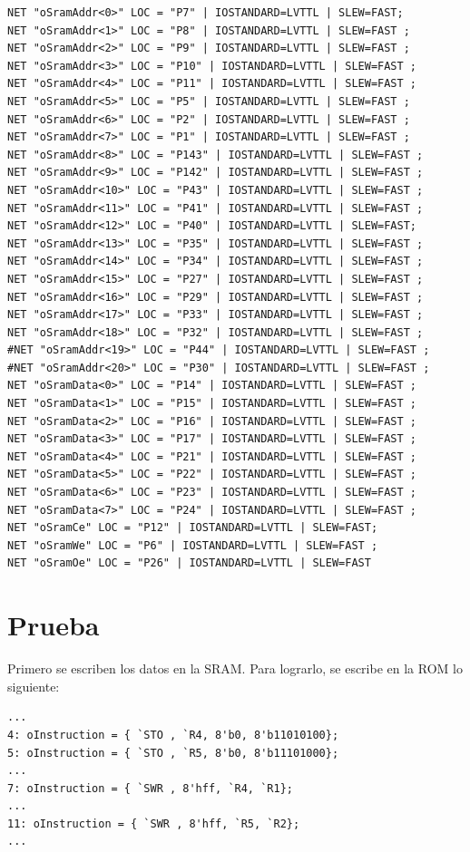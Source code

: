 \documentclass[10pt]{article}
\begin{document}
\begin{lstlisting}
NET "oSramAddr<0>" LOC = "P7" | IOSTANDARD=LVTTL | SLEW=FAST;
NET "oSramAddr<1>" LOC = "P8" | IOSTANDARD=LVTTL | SLEW=FAST ;
NET "oSramAddr<2>" LOC = "P9" | IOSTANDARD=LVTTL | SLEW=FAST ;
NET "oSramAddr<3>" LOC = "P10" | IOSTANDARD=LVTTL | SLEW=FAST ;
NET "oSramAddr<4>" LOC = "P11" | IOSTANDARD=LVTTL | SLEW=FAST ;
NET "oSramAddr<5>" LOC = "P5" | IOSTANDARD=LVTTL | SLEW=FAST ;
NET "oSramAddr<6>" LOC = "P2" | IOSTANDARD=LVTTL | SLEW=FAST ;
NET "oSramAddr<7>" LOC = "P1" | IOSTANDARD=LVTTL | SLEW=FAST ;
NET "oSramAddr<8>" LOC = "P143" | IOSTANDARD=LVTTL | SLEW=FAST ;
NET "oSramAddr<9>" LOC = "P142" | IOSTANDARD=LVTTL | SLEW=FAST ;
NET "oSramAddr<10>" LOC = "P43" | IOSTANDARD=LVTTL | SLEW=FAST ;
NET "oSramAddr<11>" LOC = "P41" | IOSTANDARD=LVTTL | SLEW=FAST ;
NET "oSramAddr<12>" LOC = "P40" | IOSTANDARD=LVTTL | SLEW=FAST;
NET "oSramAddr<13>" LOC = "P35" | IOSTANDARD=LVTTL | SLEW=FAST ;
NET "oSramAddr<14>" LOC = "P34" | IOSTANDARD=LVTTL | SLEW=FAST ;
NET "oSramAddr<15>" LOC = "P27" | IOSTANDARD=LVTTL | SLEW=FAST ;
NET "oSramAddr<16>" LOC = "P29" | IOSTANDARD=LVTTL | SLEW=FAST ;
NET "oSramAddr<17>" LOC = "P33" | IOSTANDARD=LVTTL | SLEW=FAST ;
NET "oSramAddr<18>" LOC = "P32" | IOSTANDARD=LVTTL | SLEW=FAST ;
#NET "oSramAddr<19>" LOC = "P44" | IOSTANDARD=LVTTL | SLEW=FAST ;
#NET "oSramAddr<20>" LOC = "P30" | IOSTANDARD=LVTTL | SLEW=FAST ;
NET "oSramData<0>" LOC = "P14" | IOSTANDARD=LVTTL | SLEW=FAST ;
NET "oSramData<1>" LOC = "P15" | IOSTANDARD=LVTTL | SLEW=FAST ;
NET "oSramData<2>" LOC = "P16" | IOSTANDARD=LVTTL | SLEW=FAST ;
NET "oSramData<3>" LOC = "P17" | IOSTANDARD=LVTTL | SLEW=FAST ;
NET "oSramData<4>" LOC = "P21" | IOSTANDARD=LVTTL | SLEW=FAST ;
NET "oSramData<5>" LOC = "P22" | IOSTANDARD=LVTTL | SLEW=FAST ;
NET "oSramData<6>" LOC = "P23" | IOSTANDARD=LVTTL | SLEW=FAST ;
NET "oSramData<7>" LOC = "P24" | IOSTANDARD=LVTTL | SLEW=FAST ;
NET "oSramCe" LOC = "P12" | IOSTANDARD=LVTTL | SLEW=FAST;
NET "oSramWe" LOC = "P6" | IOSTANDARD=LVTTL | SLEW=FAST ;
NET "oSramOe" LOC = "P26" | IOSTANDARD=LVTTL | SLEW=FAST
\end{lstlisting}

\section{Prueba}
Primero se escriben los datos en la SRAM. Para lograrlo, se escribe en la ROM lo siguiente:

\begin{lstlisting}
...
4: oInstruction = { `STO , `R4, 8'b0, 8'b11010100};
5: oInstruction = { `STO , `R5, 8'b0, 8'b11101000};
...
7: oInstruction = { `SWR , 8'hff, `R4, `R1};
...
11: oInstruction = { `SWR , 8'hff, `R5, `R2};
...
\end{lstlisting}
\end{document}
